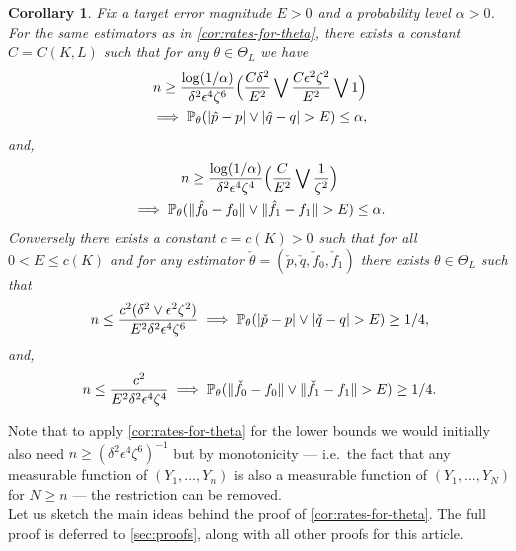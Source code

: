 \documentclass[journal]{IEEEtran}
\newtheorem{corollary}{Corollary}
\newcommand{\1}{\boldsymbol{1}}
\newcommand{\PP}{\mathbb{P}}
\DeclarePairedDelimiter{\brackets}{(}{)}
\DeclarePairedDelimiter{\norm}{\lVert}{\rVert}
\DeclarePairedDelimiter{\abs}{\lvert}{\rvert}
\begin{document}
\begin{corollary}
  \label{cor:learning-rate}
  Fix a target error magnitude $E>0$ and a probability level $\alpha>0$. For the same estimators as in \cref{cor:rates-for-theta}, there exists a constant $C=C(K,L)$ such that for any $\theta\in \Theta_L$ we have
  \begin{multline*}
    n\geq \frac{\log(1/\alpha)}{\delta^2\epsilon^4\zeta^6}\brackets[\Big]{ \frac{C\delta^2}{E^{2}}\bigvee\frac{C\epsilon^2\zeta^2}{E^{2}}\bigvee 1}\\ \implies \PP_{\theta}(\abs{\hat{p}-p} \vee \abs{\hat{q}-q} > E)\leq \alpha,
  \end{multline*}
  and,
  \begin{multline*}
    n\geq \frac{\log(1/\alpha)}{\delta^2\epsilon^4\zeta^4}\brackets[\Big]{\frac{C}{E^2}\bigvee\frac{1}{\zeta^2}}\\
    \implies%
    \PP_{\theta}(\norm{\hat{f_0}-f_0} \vee \norm{\hat{f}_1-f_1}> E)\leq \alpha.
  \end{multline*}
  Conversely there exists a constant $c=c(K)>0$ such that for all $0 < E \leq c(K)$ and for any estimator $\check{\theta}=(\check{p},\check{q},\check{f}_0,\check{f}_1)$ there exists $\theta\in \Theta_L$ such that
  \begin{equation*}
    n\leq \frac{c^2(\delta^2\vee\epsilon^2\zeta^2)}{E^2\delta^2\epsilon^4\zeta^6}
    \implies%
    \PP_\theta( \abs{\check{p}-p} \vee \abs{\check{q}-q} >E)\geq 1/4,
  \end{equation*}
  and,
  \begin{equation*}
    n\leq \frac{c^2}{E^2\delta^2\epsilon^4\zeta^4} %
    \implies \PP_{\theta}(\norm{\check{f}_0-f_0}\vee\norm{\check{f}_1-f_1}>E)\geq 1/4.
  \end{equation*}
\end{corollary}
	Note that to apply \cref{cor:rates-for-theta} for the lower bounds we would initially also need $n\geq (\delta^2\epsilon^4\zeta^6)^{-1}$ but by monotonicity --- i.e.\ the fact that any measurable function of $(Y_1,\dots,Y_n)$ is also a measurable function of $(Y_1,\dots,Y_N)$ for $N\geq n$ --- the restriction can be removed.\\



	Let us sketch the main ideas behind the proof of \cref{cor:rates-for-theta}. The
	full proof is deferred to \cref{sec:proofs}, along with all other proofs for this article.
\end{document}
